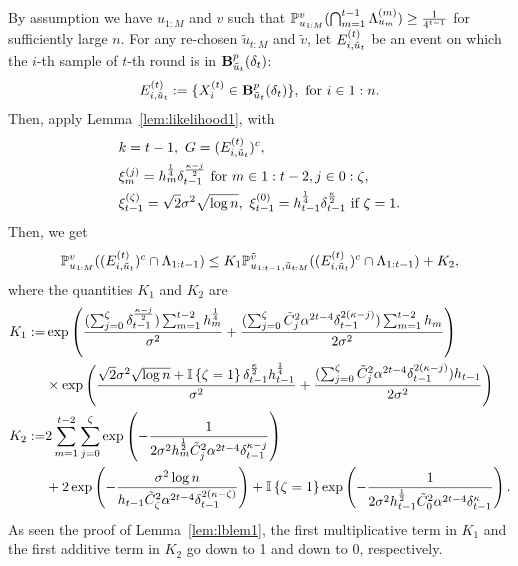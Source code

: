 By assumption we have $u_{1:M}$ and $v$ 
such that $\mathbb{P}_{u_{1:M}}^v (\bigcap_{m=1}^{t-1} \Lambda_{u_{m}}^{({m})} ) \geq \frac{1}{4^{t-1}}$ for sufficiently large $n$.
For any re-chosen $\tilde u_{t:M}$ and $\tilde v$,
let $E_{i, \tilde u_t}^{(t)}$ be an event on which the $i$-th sample of $t$-th round is in $\mathbf{B}^p_{\tilde u_t}({\delta_t})$:
\begin{equation*}
	E_{i, \tilde u_t}^{(t)} := \{ X_i^{(t)} \in \mathbf{B}^p_{\tilde u_t}({\delta_t}) \}, \text{ for } i \in 1:n.
\end{equation*}
Then, apply Lemma~\ref{lem:likelihood1}, with
\begin{align*}
	&k = t-1, ~
	G = (E_{i, \tilde u_t}^{(t)})^c,\\
	&\xi_m^{(j)} = h_m^{\frac{1}{4}} \delta_{t-1}^{\frac{\kappa-j}{2}} \text{ for } m \in 1:t-2, j \in 0:\zeta,\\
	&\xi_{t-1}^{(\zeta)} = \sqrt{2}\sigma^2 \sqrt{\log n}, ~
	\xi_{t-1}^{(0)} = h_{t-1}^{\frac{1}{4}} \delta_{t-1}^{\frac{\kappa}{2}} \text { if } \zeta = 1.
\end{align*}
Then, we get 
\begin{equation*}
	\mathbb{P}_{u_{1:M}}^v ( (E_{i, \tilde u_t}^{(t)})^c \cap \Lambda_{1:{t-1}} )
	\leq K_1 \mathbb{P}_{u_{1:t-1}, \tilde u_{t:M}}^{\tilde v} ( (E_{i, \tilde u_t}^{(t)})^c \cap \Lambda_{1:{t-1}} ) + K_2,
\end{equation*}
where the quantities $K_1$ and $K_2$ are
\begin{align*}
	K_1 :=& \exp \left ( \frac{(\sum_{j=0}^\zeta \delta_{t-1}^{\frac{\kappa-j}{2}}) \sum_{m=1}^{t-2} h_m^{\frac{1}{4}} }{\sigma^2} + 
	\frac {(\sum_{j=0}^\zeta \tilde C_j^2 \alpha^{2t-4} \delta_{t-1}^{2(\kappa-j)}) \sum_{m=1}^{t-2} h_m}{2 \sigma^2}  \right )\\
	&\times \exp \left ( \frac{\sqrt 2 \sigma^2 \sqrt{\log n} + \mathbb{I}\left\{{\zeta = 1}\right\} \delta_{t-1}^{\frac{\kappa}{2}} h_{t-1}^{\frac{1}{4}} }{\sigma^2} + 
	\frac {(\sum_{j=0}^\zeta \tilde C_j^2 \alpha^{2t-4} \delta_{t-1}^{2(\kappa-j)}) h_{t-1}}{2 \sigma^2}  \right )\\
	K_2 :=& 2 \sum_{m=1}^{t-2} \sum_{j=0}^{\zeta}
	\exp \left (  -\frac {1}{2 \sigma^2  h_{m}^{\frac{1}{2}} \tilde C_j^2 \alpha^{2t-4} \delta_{t-1}^{\kappa-j}}  \right )\\
	&+2 \exp \left (  -\frac {\sigma^2 \log n}{h_{t-1} \tilde C_\zeta^2 \alpha^{2t-4} \delta_{t-1}^{2(\kappa-\zeta)}}  \right )
	+ \mathbb{I}\left\{{\zeta = 1}\right\}
	\exp \left (  -\frac {1}{2 \sigma^2  h_{t-1}^{\frac{1}{2}} \tilde C_0^2 \alpha^{2t-4} \delta_{t-1}^{\kappa}} \right ).
\end{align*}
As seen the proof of Lemma~\ref{lem:lblem1}, the first multiplicative term in $K_1$ and the first additive term in $K_2$ go down to 1 and down to 0, respectively.
